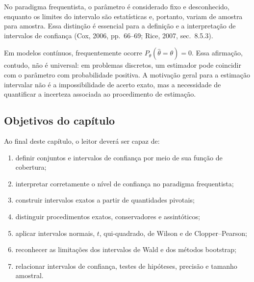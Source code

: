 \documentclass[
  letterpaper,
  DIV=11,
  numbers=noendperiod]{scrreprt}
\providecommand{\tightlist}{%
  \setlength{\itemsep}{0pt}\setlength{\parskip}{0pt}}\usepackage{longtable,booktabs,array}
\begin{document}
No paradigma frequentista, o parâmetro é considerado fixo e
desconhecido, enquanto os limites do intervalo são estatísticas e,
portanto, variam de amostra para amostra. Essa distinção é essencial
para a definição e a interpretação de intervalos de confiança (Cox,
2006, pp.~66--69; Rice, 2007, sec.~8.5.3).

\begin{tcolorbox}[enhanced jigsaw, colback=white, leftrule=.75mm, colbacktitle=quarto-callout-important-color!10!white, breakable, titlerule=0mm, bottomtitle=1mm, title=\textcolor{quarto-callout-important-color}{\faExclamation}\hspace{0.5em}{Observação --- por que a estimativa pontual não é suficiente?}, colframe=quarto-callout-important-color-frame, toprule=.15mm, opacityback=0, bottomrule=.15mm, opacitybacktitle=0.6, arc=.35mm, toptitle=1mm, rightrule=.15mm, coltitle=black, left=2mm]

Em modelos contínuos, frequentemente ocorre
\(P_\theta(\widehat\theta=\theta)=0\). Essa afirmação, contudo, não é
universal: em problemas discretos, um estimador pode coincidir com o
parâmetro com probabilidade positiva. A motivação geral para a estimação
intervalar não é a impossibilidade de acerto exato, mas a necessidade de
quantificar a incerteza associada ao procedimento de estimação.

\end{tcolorbox}

\subsection*{Objetivos do capítulo}\label{objetivos-do-capuxedtulo-1}

Ao final deste capítulo, o leitor deverá ser capaz de:

\begin{enumerate}
\def\labelenumi{\arabic{enumi}.}
\tightlist
\item
  definir conjuntos e intervalos de confiança por meio de sua função de
  cobertura;
\item
  interpretar corretamente o nível de confiança no paradigma
  frequentista;
\item
  construir intervalos exatos a partir de quantidades pivotais;
\item
  distinguir procedimentos exatos, conservadores e assintóticos;
\item
  aplicar intervalos normais, \(t\), qui-quadrado, de Wilson e de
  Clopper--Pearson;
\item
  reconhecer as limitações dos intervalos de Wald e dos métodos
  bootstrap;
\item
  relacionar intervalos de confiança, testes de hipóteses, precisão e
  tamanho amostral.
\end{enumerate}
\end{document}
